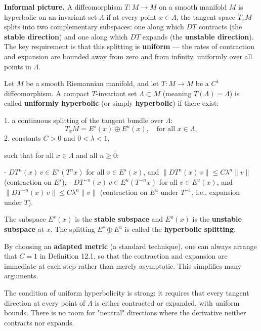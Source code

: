 \textbf{Informal picture.} A diffeomorphism $T: M \to M$ on a smooth manifold $M$ is hyperbolic on an invariant set $\Lambda$ if at every point $x \in \Lambda$, the tangent space $T_x M$ splits into two complementary subspaces: one along which $DT$ contracts (the \textbf{stable direction}) and one along which $DT$ expands (the \textbf{unstable direction}). The key requirement is that this splitting is \textbf{uniform} --- the rates of contraction and expansion are bounded away from zero and from infinity, uniformly over all points in $\Lambda$.

\begin{definition}\label{def:12.1}
Let $M$ be a smooth Riemannian manifold, and let $T: M \to M$ be a $C^1$ diffeomorphism. A compact $T$-invariant set $\Lambda \subset M$ (meaning $T(\Lambda) = \Lambda$) is called \textbf{uniformly hyperbolic} (or simply \textbf{hyperbolic}) if there exist:

1. a continuous splitting of the tangent bundle over $\Lambda$:
\[
T_x M = E^s(x) \oplus E^u(x), \quad \text{for all } x \in \Lambda,
\]
2. constants $C > 0$ and $0 < \lambda < 1$,

such that for all $x \in \Lambda$ and all $n \geq 0$:

- $DT^n(x) \, v \in E^s(T^n x)$ for all $v \in E^s(x)$, and $\|DT^n(x) \, v\| \leq C \lambda^n \|v\|$ (contraction on $E^s$),
- $DT^{-n}(x) \, v \in E^u(T^{-n} x)$ for all $v \in E^u(x)$, and $\|DT^{-n}(x) \, v\| \leq C \lambda^n \|v\|$ (contraction on $E^u$ under $T^{-1}$, i.e., expansion under $T$).

The subspace $E^s(x)$ is the \textbf{stable subspace} and $E^u(x)$ is the \textbf{unstable subspace} at $x$. The splitting $E^s \oplus E^u$ is called the \textbf{hyperbolic splitting}.
\end{definition}


\begin{remark}
By choosing an \textbf{adapted metric} (a standard technique), one can always arrange that $C = 1$ in Definition 12.1, so that the contraction and expansion are immediate at each step rather than merely asymptotic. This simplifies many arguments.

The condition of uniform hyperbolicity is strong: it requires that every tangent direction at every point of $\Lambda$ is either contracted or expanded, with uniform bounds. There is no room for "neutral" directions where the derivative neither contracts nor expands.
\end{remark}


